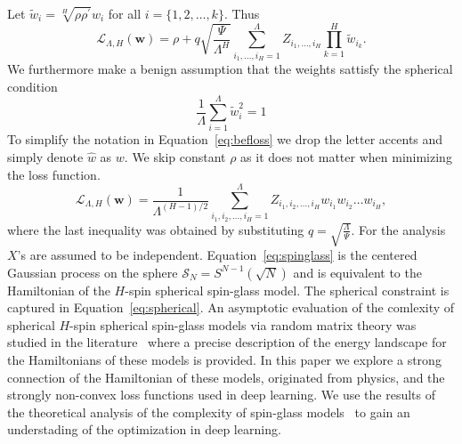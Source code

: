 \documentclass[twoside]{article}
\begin{document}
Let $\tilde{w}_i = \sqrt[H]{\rho\rho^{'}}w_i$ for all $i = \{1,2,\dots,k\}$.  Thus
\begin{equation}
\mathcal{L}_{\Lambda,H}({\bm w}) = \rho + q\sqrt{\frac{\Psi}{\Lambda^H}}\sum_{i_1,\dots,i_H=1}^{\Lambda}Z_{i_1,\dots,i_H}\prod_{k = 1}^{H}\tilde{w}_{i_k}.
\label{eq:befloss}
\end{equation}
We furthermore make a benign assumption that the weights sattisfy the spherical condition 
\begin{equation}
\frac{1}{\Lambda}\sum_{i=1}^{\Lambda}\tilde{w}_i^2 = 1
\label{eq:spherical}
\end{equation}
To simplify the notation in Equation~\ref{eq:befloss} we drop the letter accents and simply denote $\hat{w}$ as $w$. We skip constant $\rho$ as it does not matter when minimizing the loss function.
\begin{equation}
\mathcal{L}_{\Lambda,H}({\bm w}) = \frac{1}{\Lambda^{(H-1)/2}}\!\!\!\!\sum_{i_1,i_2,\dots,i_H=1}^{\Lambda}\!\!\!\!\!\!\!Z_{i_1,i_2,\dots,i_H}w_{i_1}w_{i_2}\dots\!w_{i_H},
\label{eq:spinglass}
\end{equation}
where the last inequality was obtained by substituting $q = \sqrt{\frac{\Lambda}{\Psi}}$. For the analysis $X$'s are assumed to be independent. Equation~\ref{eq:spinglass} is the centered Gaussian process on the sphere $\mathcal{S}_{N} = S^{N-1}(\sqrt{N})$ and is equivalent to the Hamiltonian of the $H$-spin spherical spin-glass model. The spherical constraint is captured in Equation~\ref{eq:spherical}. An asymptotic evaluation of the comlexity of spherical $H$-spin spherical spin-glass models via random matrix theory was studied in the literature~\cite{AAC2010} where a precise description of the energy landscape for the Hamiltonians of these models is provided. In this paper we explore a strong connection of the Hamiltonian of these models, originated from physics, and the strongly non-convex loss functions used in deep learning. We use the results of the theoretical analysis of the complexity of spin-glass models~\cite{AAC2010} to gain an understading of the optimization in deep learning. 
\end{document}
